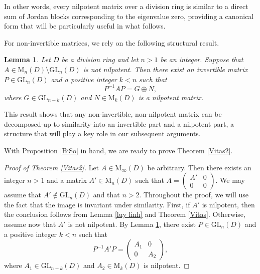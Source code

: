 \documentclass[11pt]{article}
\newtheorem{lemma}[theorem]{Lemma}
\theoremstyle{definition}
\begin{document}
{{{{				In other words, every nilpotent matrix over a division ring is similar to a direct sum of Jordan blocks corresponding to the eigenvalue zero, providing a canonical form that will be particularly useful in what follows.
				
				For non-invertible matrices, we rely on the following structural result.
				
				\begin{lemma} {\rm\cite[Theorem 15, Page 28]{Bo_Ja_43}}\label{k kha nghich}
					Let \( D \) be a division ring and let \( n > 1 \) be an integer. Suppose that \( A \in \mathrm{M}_n(D) \setminus \mathrm{GL}_n(D) \) is not nilpotent. Then there exist an invertible matrix \( P \in \mathrm{GL}_n(D) \) and a positive integer \( k < n \) such that
					\[
					P^{-1} A P = G \oplus N,
					\]
					where \( G \in \mathrm{GL}_{n-k}(D) \) and \( N \in \mathrm{M}_k(D) \) is a nilpotent matrix.
				\end{lemma}
				
				This result shows that any non-invertible, non-nilpotent matrix can be decomposed-up to similarity-into an invertible part and a nilpotent part, a structure that will play a key role in our subsequent arguments.
				
				With Proposition \ref{BiSo} in hand, we are ready to prove Theorem \ref{Vitas2}.
				
				\begin{proof}[Proof of Theorem {\rm \ref{Vitas2}}]
					Let \( A \in \mathrm{M}_\infty(D) \) be arbitrary. Then there exists an integer \( n > 1 \) and a matrix \( A' \in \mathrm{M}_n(D) \) such that
					$
					A =
					\begin{pmatrix}
						A' & 0 \\
						0 & 0
					\end{pmatrix}.
					$
					We may assume that \( A' \notin \mathrm{GL}_n(D) \) and that \( n > 2 \). Throughout the proof, we will use the fact that the image is invariant under similarity. First,	if \( A' \) is nilpotent, then the conclusion follows from Lemma \ref{luy linh} and Theorem \ref{Vitas}. Otherwise, assume now that \( A' \) is not nilpotent. By Lemma \ref{k kha nghich}, there exist \( P \in \mathrm{GL}_n(D) \) and a positive integer \( k < n \) such that
					\[
					P^{-1} A' P =
					\begin{pmatrix}
						A_1 & 0 \\
						0 & A_2
					\end{pmatrix},
					\]
					where \( A_1 \in \mathrm{GL}_{n-k}(D) \) and \( A_2 \in \mathrm{M}_k(D) \) is nilpotent.
					

\end{proof}}}}}
\end{document}
